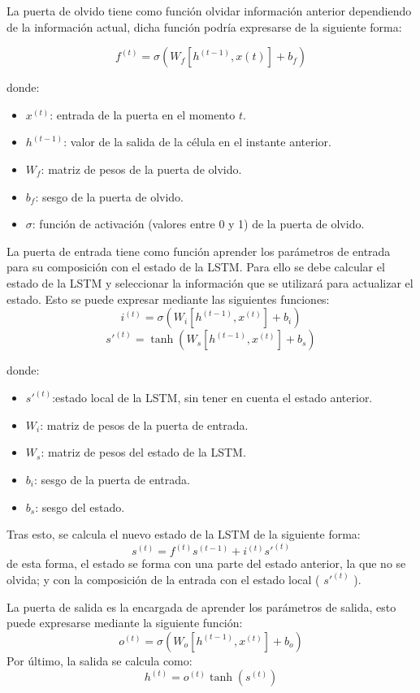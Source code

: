 La puerta de olvido tiene como función olvidar información anterior dependiendo de la información actual, dicha función podría expresarse de la siguiente forma:

$$ f^{(t)} = \sigma( W_f[h^{(t-1)}, x(t)] + b_f) $$

\noindent donde:
\begin{itemize}
	\item $x^{(t)}$: entrada de la puerta en el momento $t$.
	\item $h^{(t-1)} $: valor de la salida de la célula en el instante anterior.
	\item $W_f $: matriz de pesos de la puerta de olvido.
	\item $b_f $: sesgo de la puerta de olvido.
	\item $\sigma$: función de activación (valores entre 0 y 1) de la puerta de olvido.
\end{itemize}
\verticalspace

La puerta de entrada tiene como función aprender los parámetros de entrada para su composición con el estado de la LSTM. Para ello se debe calcular el estado de la LSTM y seleccionar la información que se utilizará para actualizar el estado. Esto se puede expresar mediante las siguientes funciones:\newline
$$ i^{(t)} = \sigma(W_i[h^{(t-1)}, x^{(t)}] + b_i) $$
$$ s'^{(t)} = \tanh(W_s[h^(t-1), x^{(t)}] + b_s) $$

\noindent donde:
\begin{itemize}
	\item $s'^{(t)}$:estado local de la LSTM, sin tener en cuenta el estado anterior.
	\item $W_i$: matriz de pesos de la puerta de entrada.
	\item $W_s$: matriz de pesos del estado de la LSTM.
	\item $b_i $: sesgo de la puerta de entrada.
	\item $b_s$: sesgo del estado.
\end{itemize}
\verticalspace

Tras esto, se calcula el nuevo estado de la LSTM de la siguiente forma:\newline
$$ s^{(t)} = f^{(t)}s^{(t-1)} + i^{(t)} s'^{(t)} $$
de esta forma, el estado se forma con una parte del estado anterior, la que no se olvida; y con la composición de la entrada con el estado local ( $s'^{(t)}$ ).
\verticalspace

La puerta de salida es la encargada de aprender los parámetros de salida, esto puede expresarse mediante la siguiente función:\newline
$$ o^{(t)} = \sigma(W_o[h^{(t-1)}, x^{(t)}] + b_o) $$
Por último, la salida se calcula como:\newline
$$h^{(t)} = o^{(t)}\tanh(s^{(t)}) $$

